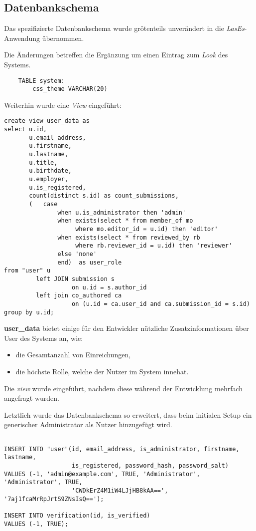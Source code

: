 \subsection{Datenbankschema}
\newline
Das spezifizierte Datenbankschema wurde grötenteils unverändert in die \emph{LasEs}-Anwendung
übernommen.

Die Änderungen betreffen die Ergänzung um einen Eintrag
zum \emph{Look} des Systems.
\begin{verbatim}
    TABLE system:
        css_theme VARCHAR(20)
\end{verbatim}

Weiterhin wurde eine \emph{View} eingeführt:
\begin{verbatim}
create view user_data as
select u.id,
       u.email_address,
       u.firstname,
       u.lastname,
       u.title,
       u.birthdate,
       u.employer,
       u.is_registered,
       count(distinct s.id) as count_submissions,
       (   case
               when u.is_administrator then 'admin'
               when exists(select * from member_of mo
                    where mo.editor_id = u.id) then 'editor'
               when exists(select * from reviewed_by rb
                    where rb.reviewer_id = u.id) then 'reviewer'
               else 'none'
               end)  as user_role
from "user" u
         left JOIN submission s
                   on u.id = s.author_id
         left join co_authored ca
                   on (u.id = ca.user_id and ca.submission_id = s.id)
group by u.id;
\end{verbatim}
\textbf{user\_data} bietet einige für den Entwickler nützliche Zusatzinformationen
über User des Systems an, wie:
\begin{itemize}
    \item die Gesamtanzahl von Einreichungen,
    \item die höchste Rolle, welche der Nutzer im System innehat.
\end{itemize}
Die \emph{view} wurde eingeführt, nachdem diese während der Entwicklung mehrfach angefragt wurden.

Letztlich wurde das Datenbankschema so erweitert, dass beim initialen Setup ein
generischer Administrator als Nutzer hinzugefügt wird.
\begin{verbatim}

INSERT INTO "user"(id, email_address, is_administrator, firstname, lastname,
                   is_registered, password_hash, password_salt)
VALUES (-1, 'admin@example.com', TRUE, 'Administrator', 'Administrator', TRUE,
                   'CWDkErZ4M1iW4LJjHB8kAA==', '7aj1fcaMrRpJrtS9ZNsIsQ==');

INSERT INTO verification(id, is_verified)
VALUES (-1, TRUE);
\end{verbatim}


